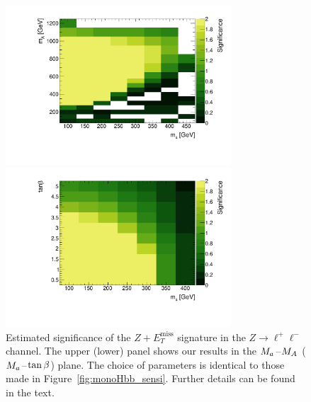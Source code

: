 \documentclass[a4paper, 11pt,notoc]{article}
\newcommand{\MET}{\ensuremath{E_T^\mathrm{miss}}\xspace}
\newcommand{\mA}{\ensuremath{M_{A}}\xspace}
\newcommand{\ma}{\ensuremath{M_{a}}\xspace}
\begin{document}
\begin{figure}[t!]
\centering
\includegraphics[width=0.75\textwidth]{mAma_Significance_ll.pdf}

\vspace{2mm}

\includegraphics[width=0.75\textwidth]{tanbma_Significance_ll.pdf}
\vspace{2mm}
\caption{Estimated significance of the $Z+\MET$ signature in the $Z \to \ell^+ \ell^-$ channel. The upper (lower) panel shows our results in the $\ma\hspace{0.25mm}$--$\hspace{0.25mm}\mA$ ($\ma\hspace{0.25mm}$--$\hspace{0.25mm}\tan \beta$) plane. The choice of parameters is identical to those made in Figure~\ref{fig:monoHbb_sensi}. Further details can be found in the text. }
\label{fig:monoZll_sensi}
\end{figure}
 
\end{document}
